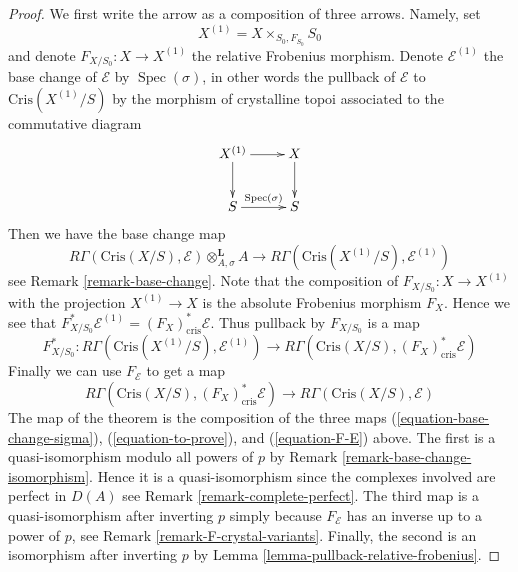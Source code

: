 \documentclass{stacks-project}
\theoremstyle{plain}
\theoremstyle{definition}
\theoremstyle{remark}
\numberwithin{equation}{subsection}
\def\Spec{\mathop{\mathrm{Spec}}}
\begin{document}
\begin{proof}
We first write the arrow as a composition of three arrows.
Namely, set
$$
X^{(1)} = X \times_{S_0, F_{S_0}} S_0
$$
and denote $F_{X/S_0} : X \to X^{(1)}$ the relative Frobenius morphism.
Denote $\mathcal{E}^{(1)}$ the base change of $\mathcal{E}$
by $\Spec(\sigma)$, in other words the pullback of $\mathcal{E}$
to $\text{Cris}(X^{(1)}/S)$ by the morphism of crystalline topoi
associated to the commutative diagram
$$
\xymatrix{
X^{(1)} \ar[r] \ar[d] & X \ar[d] \\
S \ar[r]^{\Spec(\sigma)} & S
}
$$
Then we have the base change map
\begin{equation}
\label{equation-base-change-sigma}
R\Gamma(\text{Cris}(X/S), \mathcal{E}) \otimes^\mathbf{L}_{A, \sigma} A
\longrightarrow
R\Gamma(\text{Cris}(X^{(1)}/S), \mathcal{E}^{(1)})
\end{equation}
see Remark \ref{remark-base-change}. Note that the composition
of $F_{X/S_0} : X \to X^{(1)}$ with the projection $X^{(1)} \to X$
is the absolute Frobenius morphism $F_X$. Hence we see that
$F_{X/S_0}^*\mathcal{E}^{(1)} = (F_X)_{\text{cris}}^*\mathcal{E}$.
Thus pullback by $F_{X/S_0}$ is a map
\begin{equation}
\label{equation-to-prove}
F_{X/S_0}^* :
R\Gamma(\text{Cris}(X^{(1)}/S), \mathcal{E}^{(1)})
\longrightarrow
R\Gamma(\text{Cris}(X/S), (F_X)^*_{\text{cris}}\mathcal{E})
\end{equation}
Finally we can use $F_\mathcal{E}$ to get a map
\begin{equation}
\label{equation-F-E}
R\Gamma(\text{Cris}(X/S), (F_X)^*_{\text{cris}}\mathcal{E})
\longrightarrow
R\Gamma(\text{Cris}(X/S), \mathcal{E})
\end{equation}
The map of the theorem is the composition of the three maps
(\ref{equation-base-change-sigma}), (\ref{equation-to-prove}), and
(\ref{equation-F-E}) above. The first is a
quasi-isomorphism modulo all powers of $p$ by
Remark \ref{remark-base-change-isomorphism}.
Hence it is a quasi-isomorphism since the complexes involved are perfect
in $D(A)$ see Remark \ref{remark-complete-perfect}.
The third map is a quasi-isomorphism after inverting $p$ simply
because $F_\mathcal{E}$ has an inverse up to a power of $p$, see
Remark \ref{remark-F-crystal-variants}.
Finally, the second is an isomorphism after inverting $p$
by Lemma \ref{lemma-pullback-relative-frobenius}.
\end{proof}










\end{document}
